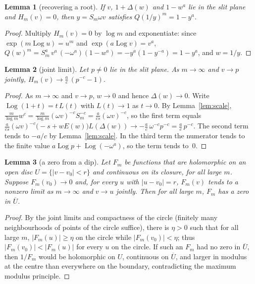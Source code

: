 \documentclass[11pt]{article}
\newtheorem{lemma}{Lemma}
\theoremstyle{definition}
\theoremstyle{remark}
\newcommand{\Log}{\operatorname{Log}}
\begin{document}
\begin{lemma}[recovering a root]\label{lem:recover}
If $v$, $1+\Delta(w)$ and $1-w^a$ lie in the slit plane and $H_m(v)=0$,
then $y=S_m\omega v$ satisfies $Q(1/y)^m=1-y^a$.
\end{lemma}

\begin{proof}
Multiply $H_m(v)=0$ by $\log m$ and exponentiate: since $\exp(m\Log u)=u^m$ and
$\exp(a\Log v)=v^a$,
$Q(w)^m=S_m^a\,v^a\,(-\omega^a)(1-w^a)=-y^a(1-y^{-a})=1-y^a$, and $w=1/y$.
\end{proof}

\begin{lemma}[joint limit]\label{lem:limit}
Let $p\ne0$ lie in the slit plane. As $m\to\infty$ and $v\to p$ jointly,
$H_m(v)\to\frac ac\,(p^{-c}-1)$.
\end{lemma}

\begin{proof}
As $m\to\infty$ and $v\to p$, $w\to0$ and hence $\Delta(w)\to0$. Write
$\Log(1+t)=t\,L(t)$ with $L(t)\to1$ as $t\to0$. By Lemma~\ref{lem:scale},
$\frac m{\log m}w^c=\frac m{\log m}(\omega v)^{-c}S_m^{-c}
=\frac a{cs}(\omega v)^{-c}$, so the first term equals
$\frac a{cs}(\omega v)^{-c}\bigl(-s+wE(w)\bigr)L(\Delta(w))
\to-\frac ac\,\omega^{-c}p^{-c}=\frac ac\,p^{-c}$. The second term tends to
$-a/c$ by Lemma~\ref{lem:scale}. In the third term the numerator tends to the
finite value $a\Log p+\Log(-\omega^a)$, so the term tends to~$0$.
\end{proof}

\begin{lemma}[a zero from a dip]\label{lem:dip}
Let $F_m$ be functions that are holomorphic on an open disc
$U=\{|v-v_0|<r\}$ and continuous on its closure, for all large $m$. Suppose
$F_m(v_0)\to0$ and, for every $u$ with $|u-v_0|=r$, $F_m(v)$ tends to a
nonzero limit as $m\to\infty$ and $v\to u$ jointly. Then for all large $m$,
$F_m$ has a zero in $\overline U$.
\end{lemma}

\begin{proof}
By the joint limits and compactness of the circle (finitely many
neighbourhoods of points of the circle suffice), there is $\eta>0$ such that
for all large $m$, $|F_m(u)|\ge\eta$ on the circle while $|F_m(v_0)|<\eta$;
thus $|F_m(v_0)|<|F_m(u)|$ for every $u$ on the circle. If such an $F_m$ had no
zero in $\overline U$, then $1/F_m$ would be holomorphic on $U$, continuous on
$\overline U$, and larger in modulus at the centre than everywhere on the
boundary, contradicting the maximum modulus principle.
\end{proof}
\end{document}
